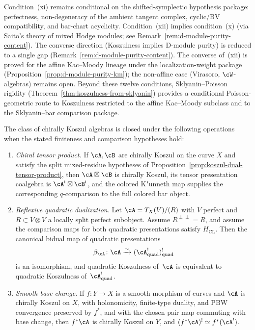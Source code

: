 \begin{remark}
Condition~\textup{(xi)} remains conditional on the
shifted-symplectic hypothesis package: perfectness, non-degeneracy of
the ambient tangent complex, cyclic/BV compatibility, and bar-chart
acyclicity. Condition~\textup{(xii)}
implies condition~\textup{(x)} (via Saito's theory of mixed Hodge
modules; see Remark~\textup{\ref{rem:d-module-purity-content}}).
The converse direction (Koszulness implies D-module purity) is
reduced to a single gap
(Remark~\ref{rem:d-module-purity-content}).
The converse of~\textup{(xii)} is proved for the affine Kac--Moody
lineage under the localization-weight package
(Proposition~\ref{prop:d-module-purity-km}); the non-affine case
(Virasoro, $\cW$-algebras) remains open.
Beyond these twelve conditions, Sklyanin--Poisson rigidity
(Theorem~\ref{thm:koszulness-from-sklyanin}) provides a conditional
Poisson-geometric route to Koszulness restricted to the affine
Kac--Moody subclass and to the Sklyanin--bar comparison package.
\end{remark}

\begin{proposition}
\label{prop:koszul-closure-properties}

The class of chirally Koszul algebras is closed under the following
operations when the stated finiteness and comparison hypotheses hold:
\begin{enumerate}[label=\textup{(\alph*)}]
\item \emph{Chiral tensor product.}
 If $\cA, \cB$ are chirally Koszul on the curve $X$ and satisfy the
 split mixed-residue hypotheses of
 Proposition~\textup{\ref{prop:koszul-dual-tensor-product}}, then
 $\cA \boxtimes \cB$ is chirally Koszul, its tensor presentation
 coalgebra is $\cA^{\mathrm i}\boxtimes\cB^{\mathrm i}$, and the
 colored K"unneth map supplies the corresponding $q$-comparison to
 the full colored bar object.
\item \emph{Reflexive quadratic dualization.}
 Let $\cA=T_X(V)/(R)$ with $V$ perfect and
 $R\subset V\otimes V$ a locally split perfect subobject.  Assume
 $R^{\perp\perp}=R$, and assume the comparison maps for both
 quadratic presentations satisfy $H_{\mathrm{CL}}$. Then the canonical
 bidual map of quadratic presentations
 \[
 \beta_\cA\colon\cA\xrightarrow{\sim}
 (\cA^!_{\mathrm{quad}})^!_{\mathrm{quad}}
 \]
 is an isomorphism, and quadratic Koszulness of~$\cA$ is equivalent to
 quadratic Koszulness of~$\cA^!_{\mathrm{quad}}$.
\item \emph{Smooth base change.}
 If $f \colon Y \to X$ is a smooth morphism of curves and
 $\cA$ is chirally Koszul on $X$, with holonomicity, finite-type
 duality, and PBW convergence preserved by $f^*$, and with the chosen
 pair map commuting with base change, then $f^*\cA$ is
 chirally Koszul on $Y$, and
 $(f^*\cA)^! \simeq f^*(\cA^!)$.
\end{enumerate}
\end{proposition}

